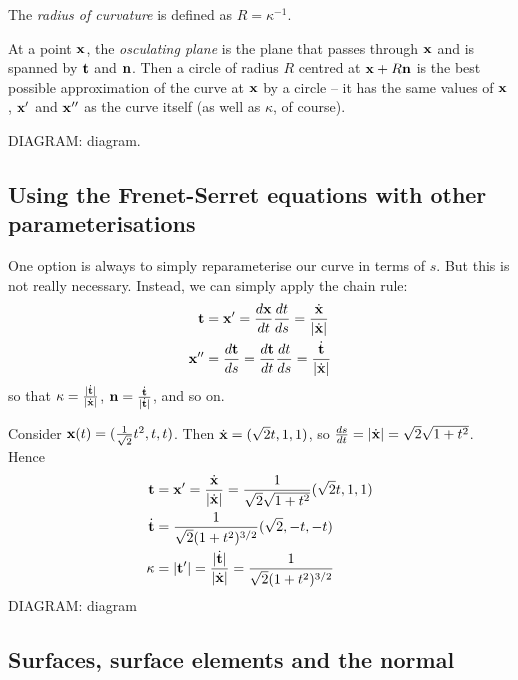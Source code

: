 \documentclass{../template/note}
\begin{document}
    \begin{definition*}
        The \emph{radius of curvature} is defined as \(R = \kappa^{-1}\).
    \end{definition*}
    
    At a point \(\V x\), the \emph{osculating plane} is the plane that passes through \(\V x\) and is spanned by \(\V t\) and \(\V n\). Then a circle of radius \(R\) centred at \(\V x + R \V n\) is the best possible approximation of the curve at \(\V x\) by a circle -- it has the same values of \(\V x\), \(\V x'\) and \(\V x''\) as the curve itself (as well as \(\kappa\), of course).

    DIAGRAM: diagram.
    
    \subsection{Using the Frenet-Serret equations with other parameterisations}

    One option is always to simply reparameterise our curve in terms of \(s\). But this is not really necessary. Instead, we can simply apply the chain rule:
    \begin{align*}
        \V t &= \V x' = \frac{d \V x}{dt} \frac{dt}{ds} = \frac{\dot{\V x}}{|\dot{\V x}|} \\
        \V x'' &= \frac{d\V t}{ds} = \frac{d \V t}{dt} \frac{dt}{ds} = \frac{\dot{\V t}}{|\dot{\V x}|}
    \end{align*}
    so that \(\kappa = \frac{|\dot{\V t}|}{|\dot{\V x}|}\), \(\V n = \frac{\dot{\V t}}{|\dot{\V t}|}\), and so on.
    
    \begin{example*}
        Consider \(\V x(t) = (\frac 1 {\sqrt 2}t^2, t, t)\). Then \(\dot{\V x} = (\sqrt 2 t, 1, 1)\), so \(\frac{ds}{dt} = |\dot{\V x}| = \sqrt 2 \sqrt{1 + t^2}\). Hence
        \begin{align*}
            \V t &= \V x' = \frac{\dot{\V x}}{|\dot{\V x}|} = \frac{1}{\sqrt 2 \sqrt{1+t^2}}(\sqrt 2 t, 1, 1) \\
            \dot{\V t} &= \frac{1}{\sqrt 2 (1+t^2)^{3/2}}(\sqrt 2, -t, -t) \\
            \kappa &= |\V t'| = \frac{|\dot{\V t}|}{|\dot{\V x}|} = \frac 1{\sqrt 2 (1+t^2)^{3/2}}
        \end{align*}
        DIAGRAM: diagram
    \end{example*}
    
    \subsection{Surfaces, surface elements and the normal}
\end{document}
